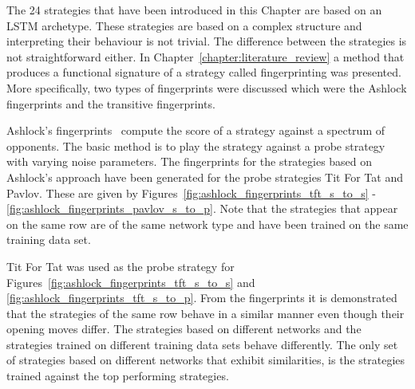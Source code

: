 The 24 strategies that have been introduced in this Chapter are based on an LSTM
archetype. These strategies are based on a complex structure and interpreting
their behaviour is not trivial. The difference between the strategies is not
straightforward either. In Chapter~\ref{chapter:literature_review} a method that
produces a functional signature of a strategy called fingerprinting was
presented. More specifically, two types of fingerprints were discussed which
were the Ashlock fingerprints and the transitive fingerprints.

Ashlock's fingerprints~\cite{Ashlock2005, Ashlock2008, Ashlock2009,
Ashlock2010, Ashlock2006a} compute the score of a strategy against a spectrum of
opponents. The basic method is to play the strategy against a probe strategy
with varying noise parameters. The fingerprints for the \lstmstrategies
strategies based on Ashlock's approach have been generated for the probe
strategies Tit For Tat and Pavlov. These are given by
Figures~\ref{fig:ashlock_fingerprints_tft_s_to_s} -
\ref{fig:ashlock_fingerprints_pavlov_s_to_p}. Note that the strategies that
appear on the same row are of the same network type and have been trained on
the same training data set.

Tit For Tat was used as the probe strategy for
Figures~\ref{fig:ashlock_fingerprints_tft_s_to_s} and
\ref{fig:ashlock_fingerprints_tft_s_to_p}. From the fingerprints it is
demonstrated that the strategies of the same row behave in a similar manner even
though their opening moves differ. The strategies based on different networks
and the strategies trained on different training data sets behave differently.
The only set of strategies based on different networks that exhibit
similarities, is the strategies trained against the top performing strategies.

